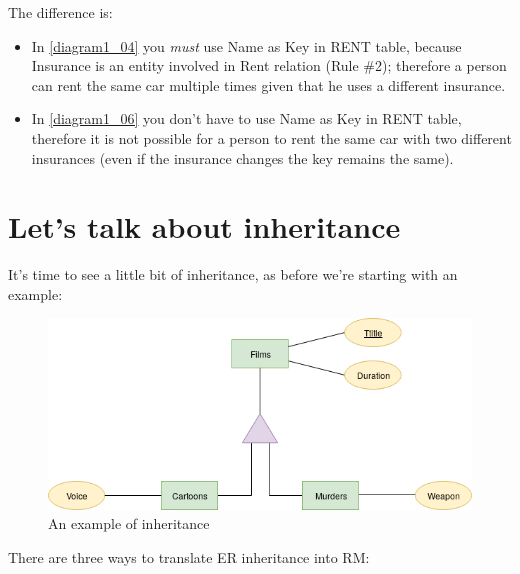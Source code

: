 \documentclass[class=book, crop=false, oneside]{standalone}
\begin{document}
The difference is:
\begin{itemize}
	\item In \ref{diagram1_04} you \emph{must} use Name as Key in RENT table, because Insurance is an entity involved in Rent relation (Rule \#2); therefore a person can rent the same car multiple times given that he uses a different insurance.\\
	\item In \ref{diagram1_06} you don't have to use Name as Key in RENT table, therefore it is not possible for a person to rent the same car with two different insurances (even if the insurance changes the key remains the same).
\end{itemize}

\section{Let's talk about inheritance}
It's time to see a little bit of inheritance, as before we're starting with an example:
\begin{figure}[H]
	\includegraphics[width=\textwidth,keepaspectratio]{diagram2_00.png}
	\caption{An example of inheritance}
	\label{diagram2_00}
\end{figure}
There are three ways to translate ER inheritance into RM:
\end{document}
